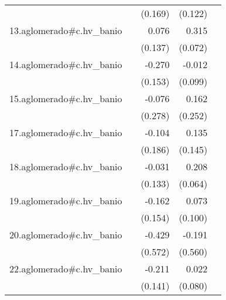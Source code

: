 {\begin{longtable}{l*{4}{D{.}{.}{-1}}}
            &                     &     (0.169)         &     (0.122)         &                     \\
\addlinespace
13.aglomerado#c.hv\_banio&                     &       0.076         &       0.315\sym{***}&                     \\
            &                     &     (0.137)         &     (0.072)         &                     \\
\addlinespace
14.aglomerado#c.hv\_banio&                     &      -0.270         &      -0.012         &                     \\
            &                     &     (0.153)         &     (0.099)         &                     \\
\addlinespace
15.aglomerado#c.hv\_banio&                     &      -0.076         &       0.162         &                     \\
            &                     &     (0.278)         &     (0.252)         &                     \\
\addlinespace
17.aglomerado#c.hv\_banio&                     &      -0.104         &       0.135         &                     \\
            &                     &     (0.186)         &     (0.145)         &                     \\
\addlinespace
18.aglomerado#c.hv\_banio&                     &      -0.031         &       0.208\sym{**} &                     \\
            &                     &     (0.133)         &     (0.064)         &                     \\
\addlinespace
19.aglomerado#c.hv\_banio&                     &      -0.162         &       0.073         &                     \\
            &                     &     (0.154)         &     (0.100)         &                     \\
\addlinespace
20.aglomerado#c.hv\_banio&                     &      -0.429         &      -0.191         &                     \\
            &                     &     (0.572)         &     (0.560)         &                     \\
\addlinespace
22.aglomerado#c.hv\_banio&                     &      -0.211         &       0.022         &                     \\
            &                     &     (0.141)         &     (0.080)         &                     \\

\end{longtable}}

